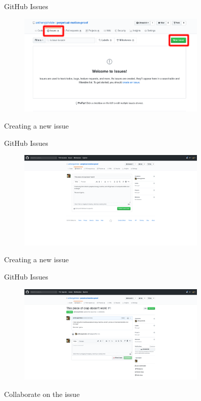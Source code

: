 \documentclass{beamer}
\begin{document}
    \begin{frame}{GitHub Issues}
        \begin{figure}
            \centering
            \includegraphics[width=0.8\textwidth]{figures/issues_1.png}
        \end{figure}
        \centering
        Creating a new issue
    \end{frame}

    \begin{frame}{GitHub Issues}
        \begin{figure}
            \centering
            \includegraphics[width=0.8\textwidth]{figures/issues_2.png}
        \end{figure}
        \centering
        Creating a new issue
    \end{frame}

    \begin{frame}{GitHub Issues}
        \begin{figure}
            \centering
            \includegraphics[width=0.8\textwidth]{figures/issues_3.png}
        \end{figure}
        \centering
        Collaborate on the issue
    \end{frame}
\end{document}
